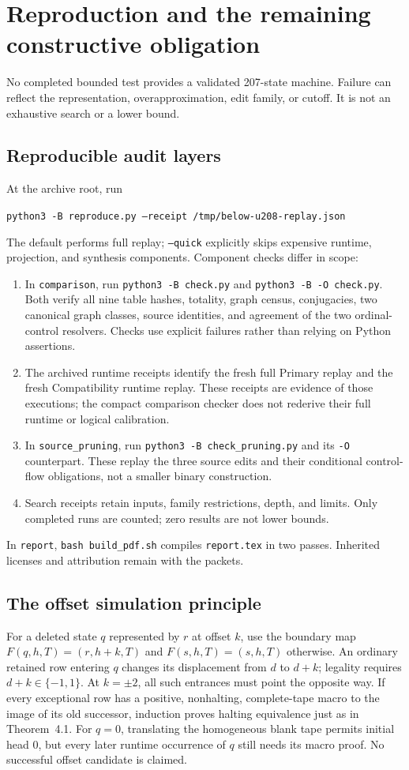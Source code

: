 \documentclass[11pt,letterpaper]{article}
\newcommand{\code}[1]{\texttt{#1}}\newcommand{\digest}[1]{{\small\texttt{\seqsplit{#1}}}}
\begin{document}
\section{Reproduction and the remaining constructive obligation}
No completed bounded test provides a validated 207-state machine. Failure
can reflect the representation, overapproximation, edit family, or cutoff.
It is not an exhaustive search or a lower bound.

\subsection{Reproducible audit layers}
At the archive root, run
\begin{center}\small\code{python3 -B reproduce.py --receipt /tmp/below-u208-replay.json}\end{center}
The default performs full replay; \code{--quick} explicitly skips expensive
runtime, projection, and synthesis components. Component checks differ in scope:
\begin{enumerate}[leftmargin=*]
\item In \code{comparison}, run \code{python3 -B check.py} and
\code{python3 -B -O check.py}. Both verify all nine table hashes, totality,
graph census, conjugacies, two canonical graph classes, source identities,
and agreement of the two ordinal-control resolvers. Checks use explicit
failures rather than relying on Python assertions.
\item The archived runtime receipts identify the fresh full Primary replay
and the fresh Compatibility runtime replay. These receipts are evidence of
those executions; the compact comparison checker does not rederive their
full runtime or logical calibration.
\item In \code{source\_pruning}, run \code{python3 -B check\_pruning.py}
and its \code{-O} counterpart. These replay the three source edits and their
conditional control-flow obligations, not a smaller binary construction.
\item Search receipts retain inputs, family restrictions, depth, and limits.
Only completed runs are counted; zero results are not lower bounds.
\end{enumerate}
In \code{report}, \code{bash build\_pdf.sh} compiles \code{report.tex} in two
passes. Inherited licenses and attribution remain with the packets.

\subsection{The offset simulation principle}
For a deleted state $q$ represented by $r$ at offset $k$, use the boundary map
$F(q,h,T)=(r,h+k,T)$ and $F(s,h,T)=(s,h,T)$ otherwise. An ordinary retained
row entering $q$ changes its displacement from $d$ to $d+k$; legality requires
$d+k\in\{-1,1\}$. At $k=\pm2$, all such entrances must point the opposite
way. If every exceptional row has a positive, nonhalting, complete-tape macro
to the image of its old successor, induction proves halting equivalence just
as in Theorem~4.1. For $q=0$, translating the homogeneous blank tape permits
initial head 0, but every later runtime occurrence of $q$ still needs its
macro proof. No successful offset candidate is claimed.
\end{document}
